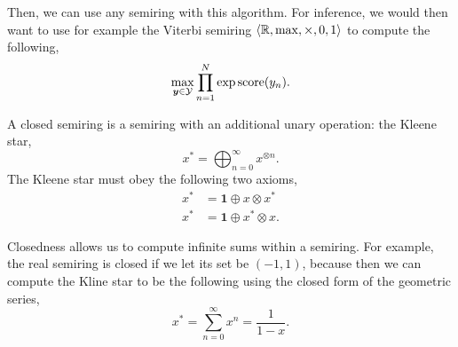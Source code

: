 Then, we can use any semiring with this algorithm. For inference, we would then
want to use for example the Viterbi semiring $\langle \mathbb{R}, \max, \times, 0, 1
    \rangle$ to compute the following, \[
    \max_{\bm{y}\in\mathcal{Y}} \prod_{n=1}^N \exp \mathrm{score}(y_n).
\]

\begin{definition}
    A closed semiring is a semiring with an additional unary operation: the
    Kleene star, \[
        x^* = \bigoplus_{n=0}^\infty x^{\otimes n}.
    \]
    The Kleene star must obey the following two axioms,
    \begin{align*}
        x^* & = \bm{1} \oplus x \otimes x^*  \\
        x^* & = \bm{1} \oplus x^* \otimes x.
    \end{align*}
\end{definition}

Closedness allows us to compute infinite sums within a semiring. For example,
the real semiring is closed if we let its set be $(-1,1)$, because then we can
compute the Kline star to be the following using the closed form of the
geometric series, \[
    x^* = \sum_{n=0}^\infty x^n = \frac{1}{1-x}.
\]
